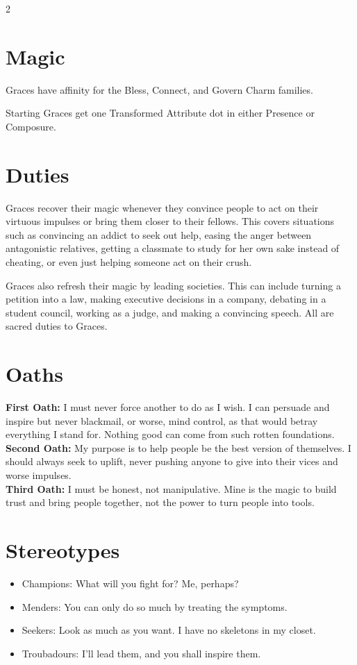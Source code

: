\begin{multicols}{2}
\section*{Magic}

Graces have affinity for the Bless, Connect, and Govern Charm families.

Starting Graces get one Transformed Attribute dot in either Presence or Composure. 

\section*{Duties}
Graces recover their magic whenever they convince people to act on their virtuous impulses or bring them closer to their fellows. This covers situations such as convincing an addict to seek out help, easing the anger between antagonistic relatives, getting a classmate to study for her own sake instead of cheating, or even just helping someone act on their crush. 

Graces also refresh their magic by leading societies. This can include turning a petition into a law, making executive decisions in a company, debating in a student council, working as a judge, and making a convincing speech. All are sacred duties to Graces. 

\section*{Oaths}
\noindent \textbf{First Oath:} I must never force another to do as I wish. I can persuade and inspire but never blackmail, or worse, mind control, as that would betray everything I stand for. Nothing good can come from such rotten foundations. \\ %

\noindent \textbf{Second Oath:} My purpose is to help people be the best version of themselves. I should always seek to uplift, never pushing anyone to give into their vices and worse impulses. \\

\noindent \textbf{Third Oath:} I must be honest, not manipulative. Mine is the magic to build trust and bring people together, not the power to turn people into tools. 

\section*{Stereotypes}
\begin{itemize}
\item Champions: What will you fight for? Me, perhaps?
\item Menders: You can only do so much by treating the symptoms. 
\item Seekers: Look as much as you want. I have no skeletons in my closet. 
\item Troubadours: I'll lead them, and you shall inspire them.


\end{itemize}
\end{multicols}
